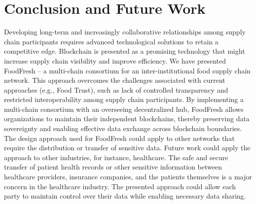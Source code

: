 \documentclass[conference]{iaria-lite}
\begin{document}
\section{Conclusion and Future Work} \label{s:conclusion}
Developing long-term and increasingly collaborative relationships among supply chain participants requires advanced technological solutions to retain a competitive edge. Blockchain is presented as a promising technology that might increase supply chain visibility and improve efficiency.  We have presented FoodFresh -- a multi-chain consortium for an inter-institutional food supply chain network. 
This approach overcomes the challenges associated with current approaches (e.g.,  Food Trust), such as lack of controlled transparency and restricted interoperability among supply chain participants. By implementing a multi-chain consortium with an overseeing decentralized hub, FoodFresh allows organizations to maintain their independent blockchains, thereby preserving data sovereignty and enabling effective data exchange across blockchain boundaries. 
The design approach used for FoodFresh could apply to other networks that require the distribution or transfer of sensitive data. Future work could apply the approach to other industries, for instance, healthcare. The safe and secure transfer of patient health records or other sensitive information between healthcare providers, insurance companies, and the patients themselves is a major concern in the healthcare industry. The presented approach could allow each party to maintain control over their data while enabling necessary data sharing.


\begingroup
\sloppy
\printbibliography
\endgroup 
\end{document}
